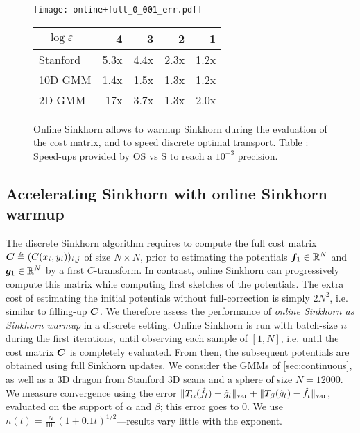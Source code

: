 \begin{figure}[t]
    \begin{widepage}
    \begin{minipage}{.7\linewidth}
    \texttt{[image: online+full\_0\_001\_err.pdf]}
    \end{minipage}%
    \hfill
    \begin{minipage}{.3\linewidth}
        \centering
        \small
        \begin{tabular}{lrrrr}
            \toprule
            $- \log \varepsilon$
            &  4 & 3 & 2 & 1 \\
            \midrule
            Stanford      &     5.3x &    4.4x &    2.3x &    1.2x \\
            10D GMM     &     1.4x &    1.5x &    1.3x &    1.2x \\
            2D GMM      &    17x &    3.7x &    1.3x &    2.0x \\
            \bottomrule
            \end{tabular}
    \end{minipage}
    \end{widepage}
    \caption{Online Sinkhorn allows to warmup Sinkhorn during the evaluation of the cost matrix, and to speed discrete optimal transport. Table \thetable: Speed-ups provided by OS vs S to reach a $10^{-3}$ precision.}
    \label{fig:warmup}
    \vspace{-.8em}
\end{figure}


\subsection{Accelerating Sinkhorn with online Sinkhorn warmup}\label{sec:accelerating}

The discrete Sinkhorn algorithm requires to compute the full cost matrix $\bm{C}
\triangleq (C(x_i,y_i))_{i,j}$  of size $N \times N$, prior to estimating the
potentials $\bm{f}_1 \in \mathbb{R}^N$ and $\bm{g}_1 \in \mathbb{R}^N$ by a first $C$-transform. In
contrast, online Sinkhorn can progressively compute this matrix while computing
first sketches of the potentials. The extra cost of estimating the initial
potentials without full-correction is simply $2 N^2$, i.e. similar to filling-up
$\bm{C}$. We therefore assess the performance of \textit{online Sinkhorn as
Sinkhorn warmup} in a discrete setting. Online Sinkhorn is run with batch-size
$n$ during the first iterations, until observing each sample of $[1,N]$, i.e.
until the cost matrix $\bm{C}$ is completely evaluated. From then, the subsequent
potentials are obtained using full Sinkhorn updates. We consider the GMMs of
\autoref{sec:continuous}, as well as a 3D dragon from Stanford 3D scans
\cite{turk1994zippered} and a sphere of size $N=12000$. We measure convergence
using the error $\Vert T_{\alpha}(\hat f_t) - \hat g_t
\Vert_{\text{\upshape var}} + \Vert T_{\beta}(\hat g_t) - \hat f_t \Vert_{\text{\upshape var}}$,
evaluated on the support of $\alpha$ and $\beta$; this error goes to $0$. We use
$n(t) = \frac{N}{100} (1+0.1t)^{1/2}$---results vary little with the exponent.


